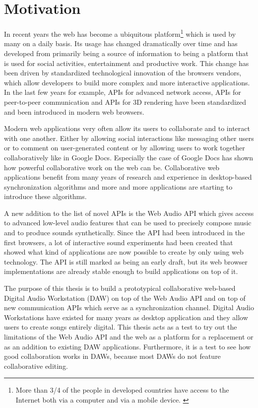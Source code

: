 \section{Motivation}

In recent years the web has become a ubiquitous platform\footnote{More than 3/4 of the people in developed countries have access to the Internet both via a computer and via a mobile device. \cite{ITU2013}} which is used by many on a daily basis. Its usage has changed dramatically over time and has developed from primarily being a source of information to being a platform that is used for social activities, entertainment and productive work. This change has been driven by standardized technological innovation of the browsers vendors, which allow developers to build more complex and more interactive applications. In the last few years for example, APIs for advanced network access, APIs for peer-to-peer communication and APIs for 3D rendering have been standardized and been introduced in modern web browsers.

Modern web applications very often allow its users to collaborate and to interact with one another. Either by allowing social interactions like messaging other users or to comment on user-generated content or by allowing users to work together collaboratively like in Google Docs. Especially the case of Google Docs has shown how powerful collaborative work on the web can be. Collaborative web applications benefit from many years of research and experience in desktop-based synchronization algorithms and more and more applications are starting to introduce these algorithms.

A new addition to the list of novel APIs is the Web Audio API which gives access to advanced low-level audio features that can be used to precisely compose music and to produce sounds synthetically. Since the API had been introduced in the first browsers, a lot of interactive sound experiments had been created that showed what kind of applications are now possible to create by only using web technology. The API is still marked as being an early draft, but its web browser implementations are already stable enough to build applications on top of it.

The purpose of this thesis is to build a prototypical collaborative web-based Digital Audio Workstation (DAW) on top of the Web Audio API and on top of new communication APIs which serve as a synchronization channel. Digital Audio Workstations have existed for many years as desktop application and they allow users to create songs entirely digital. This thesis acts as a test to try out the limitations of the Web Audio API and the web as a platform for a replacement or as an addition to existing DAW applications. Furthermore, it is a test to see how good collaboration works in DAWs, because most DAWs do not feature collaborative editing.

